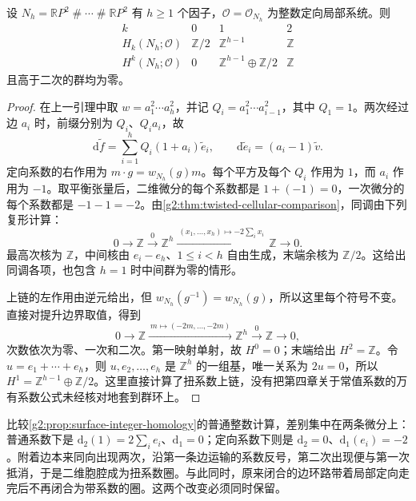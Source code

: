 \begin{proposition}\label{g2:prop:nonorientable-twisted-homology}
	设 \(N_h=\mathbb RP^2\mathbin{\#}\cdots\mathbin{\#}\mathbb RP^2\) 有 \(h\geq1\) 个因子，\(\mathcal O=\mathcal O_{N_h}\) 为整数定向局部系统。则
	\[
	\begin{array}{c|ccc}
		k&0&1&2\\\hline
		H_k(N_h;\mathcal O)&\mathbb Z/2&\mathbb Z^{h-1}&\mathbb Z\\
		H^k(N_h;\mathcal O)&0&\mathbb Z^{h-1}\oplus\mathbb Z/2&\mathbb Z
	\end{array}
	\]
	且高于二次的群均为零。
\end{proposition}
\begin{proof}
	在上一引理中取 \(w=a_1^2\cdots a_h^2\)，并记 \(Q_i=a_1^2\cdots a_{i-1}^2\)，其中 \(Q_1=1\)。两次经过边 \(a_i\) 时，前缀分别为 \(Q_i\)、\(Q_i a_i\)，故
	\[
		\mathrm d\widetilde f=\sum_{i=1}^hQ_i(1+a_i)\widetilde e_i,
		\qquad\mathrm d\widetilde e_i=(a_i-1)\widetilde v.
	\]
	定向系数的右作用为 \(m\cdot g=w_{N_h}(g)m\)。每个平方及每个 \(Q_i\) 作用为 \(1\)，而 \(a_i\) 作用为 \( -1\)。取平衡张量后，二维微分的每个系数都是 \(1+(-1)=0\)，一次微分的每个系数都是 \( -1-1=-2\)。由\cref{g2:thm:twisted-cellular-comparison}，同调由下列复形计算：
	\begin{equation}\label{g2:eq:nonorientable-twisted-chain}
		0\longrightarrow\mathbb Z\xrightarrow{\ 0\ }\mathbb Z^h
		\xrightarrow{\ (x_1,\ldots,x_h)\mapsto-2\sum_i x_i\ }\mathbb Z\longrightarrow0.
	\end{equation}
	最高次核为 \(\mathbb Z\)，中间核由 \(e_i-e_h\)、\(1\leq i<h\) 自由生成，末端余核为 \(\mathbb Z/2\)。这给出同调各项，也包含 \(h=1\) 时中间群为零的情形。

	上链的左作用由逆元给出，但 \(w_{N_h}(g^{-1})=w_{N_h}(g)\)，所以这里每个符号不变。直接对提升边界取值，得到
	\begin{equation}\label{g2:eq:nonorientable-twisted-cochain}
		0\longrightarrow\mathbb Z\xrightarrow{\ m\mapsto(-2m,\ldots,-2m)\ }\mathbb Z^h
		\xrightarrow{\ 0\ }\mathbb Z\longrightarrow0,
	\end{equation}
	次数依次为零、一次和二次。第一映射单射，故 \(H^0=0\)；末端给出 \(H^2=\mathbb Z\)。令 \(u=e_1+\cdots+e_h\)，则 \(u,e_2,\ldots,e_h\) 是 \(\mathbb Z^h\) 的一组基，唯一关系为 \(2u=0\)，所以 \(H^1=\mathbb Z^{h-1}\oplus\mathbb Z/2\)。这里直接计算了扭系数上链，没有把第四章关于常值系数的万有系数公式未经核对地套到群环上。
\end{proof}

比较\cref{g2:prop:surface-integer-homology}的普通整数计算，差别集中在两条微分上：普通系数下是 \(\mathrm d_2(1)=2\sum_i e_i\)、\(\mathrm d_1=0\)；定向系数下则是 \(\mathrm d_2=0\)、\(\mathrm d_1(e_i)=-2\)。附着边本来同向出现两次，沿第一条边运输的系数反号，第二次出现便与第一次抵消，于是二维胞腔成为扭系数圈。与此同时，原来闭合的边环路带着局部定向走完后不再闭合为带系数的圈。这两个改变必须同时保留。

